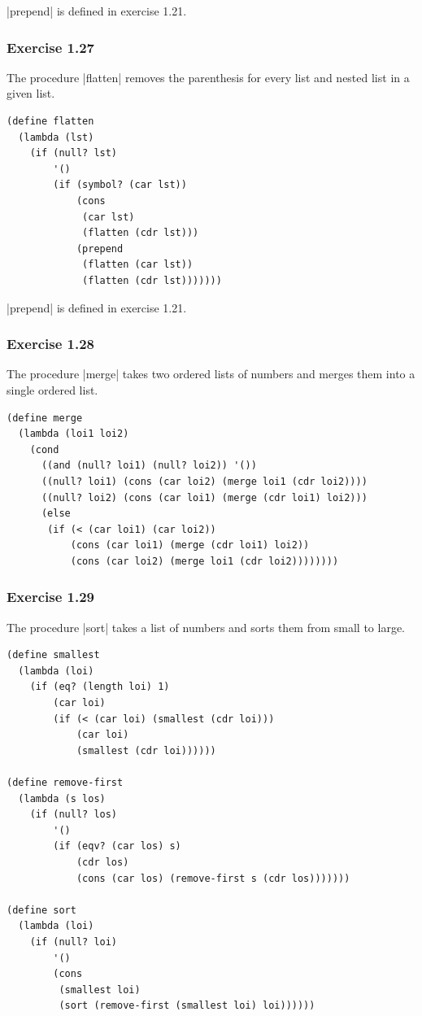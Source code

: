 \documentclass[a4paper]{article}
\begin{document}
|prepend| is defined in exercise 1.21.

\subsubsection{Exercise 1.27}

The procedure |flatten| removes the parenthesis for every list and nested list in a given list.

\begin{lstlisting}
(define flatten
  (lambda (lst)
    (if (null? lst)
        '()
        (if (symbol? (car lst))
            (cons
             (car lst)
             (flatten (cdr lst)))
            (prepend
             (flatten (car lst))
             (flatten (cdr lst)))))))
\end{lstlisting}

|prepend| is defined in exercise 1.21.

\subsubsection{Exercise 1.28}

The procedure |merge| takes two ordered lists of numbers and merges them into a single ordered list.

\begin{lstlisting}
(define merge
  (lambda (loi1 loi2)
    (cond
      ((and (null? loi1) (null? loi2)) '())
      ((null? loi1) (cons (car loi2) (merge loi1 (cdr loi2))))
      ((null? loi2) (cons (car loi1) (merge (cdr loi1) loi2)))
      (else
       (if (< (car loi1) (car loi2))
           (cons (car loi1) (merge (cdr loi1) loi2))
           (cons (car loi2) (merge loi1 (cdr loi2))))))))
\end{lstlisting}

\subsubsection{Exercise 1.29}

The procedure |sort| takes a list of numbers and sorts them from small to large.

\begin{lstlisting}
(define smallest
  (lambda (loi)
    (if (eq? (length loi) 1)
        (car loi)
        (if (< (car loi) (smallest (cdr loi)))
            (car loi)
            (smallest (cdr loi))))))

(define remove-first
  (lambda (s los)
    (if (null? los)
        '()
        (if (eqv? (car los) s)
            (cdr los)
            (cons (car los) (remove-first s (cdr los)))))))

(define sort
  (lambda (loi)
    (if (null? loi)
        '()
        (cons
         (smallest loi)
         (sort (remove-first (smallest loi) loi))))))
\end{lstlisting}
\end{document}

